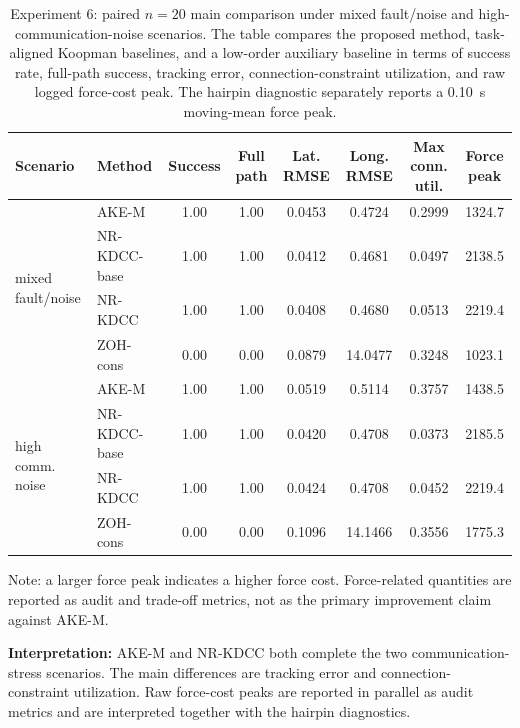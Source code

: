 \documentclass[twocolumn,3p,times,procedia]{elsarticle}
\newcommand{\AKE}{AKE-M}
\newcommand{\Method}{NR-KDCC}
\newcommand{\MethodBase}{NR-KDCC-base}
\newcommand{\ZOHcons}{ZOH-cons}
\newcommand{\TF}{\Method{}}
\begin{document}
\begin{table}[!t]
\centering
\caption{Experiment 6: paired $n=20$ main comparison under mixed fault/noise and high-communication-noise scenarios. The table compares the proposed method, task-aligned Koopman baselines, and a low-order auxiliary baseline in terms of success rate, full-path success, tracking error, connection-constraint utilization, and raw logged force-cost peak. The hairpin diagnostic separately reports a 0.10~s moving-mean force peak.}
\label{tab:e0_main}
\scriptsize
\begin{tabular}{llcccccc}
\toprule
Scenario & Method & Success & Full path & Lat. RMSE & Long. RMSE & Max conn. util. & Force peak \\
\midrule
\multirow{4}{*}{mixed fault/noise}
& \AKE{} & 1.00 & 1.00 & 0.0453 & 0.4724 & 0.2999 & 1324.7\\
& \MethodBase{} & 1.00 & 1.00 & 0.0412 & 0.4681 & 0.0497 & 2138.5\\
& \TF{} & 1.00 & 1.00 & 0.0408 & 0.4680 & 0.0513 & 2219.4\\
& \ZOHcons{} & 0.00 & 0.00 & 0.0879 & 14.0477 & 0.3248 & 1023.1\\
\midrule
\multirow{4}{*}{high comm. noise}
& \AKE{} & 1.00 & 1.00 & 0.0519 & 0.5114 & 0.3757 & 1438.5\\
& \MethodBase{} & 1.00 & 1.00 & 0.0420 & 0.4708 & 0.0373 & 2185.5\\
& \TF{} & 1.00 & 1.00 & 0.0424 & 0.4708 & 0.0452 & 2219.4\\
& \ZOHcons{} & 0.00 & 0.00 & 0.1096 & 14.1466 & 0.3556 & 1775.3\\
\bottomrule
\end{tabular}
\begin{tablenotes}
\footnotesize
\item Note: a larger force peak indicates a higher force cost. Force-related quantities are reported as audit and trade-off metrics, not as the primary improvement claim against \AKE{}.
\end{tablenotes}
\vspace{1.5mm}
\begin{minipage}{0.93\textwidth}
\footnotesize
\textbf{Interpretation:} \AKE{} and \Method{} both complete the two communication-stress scenarios. The main differences are tracking error and connection-constraint utilization. Raw force-cost peaks are reported in parallel as audit metrics and are interpreted together with the hairpin diagnostics.
\end{minipage}
\end{table}
\end{document}
